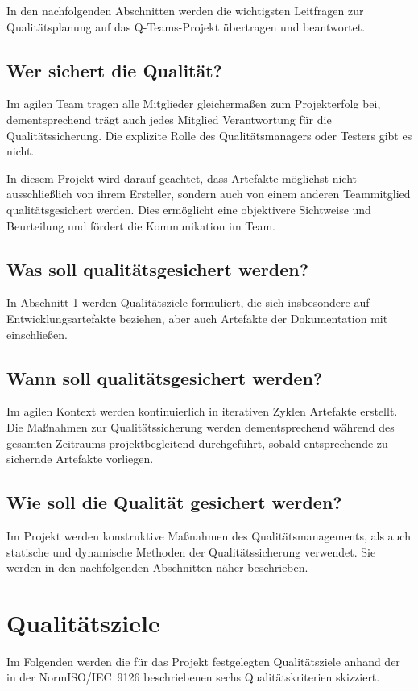 \documentclass[a4paper,11pt,listof=numbered,glossary=totoc,parskip=half,toc=bib]{scrreprt}
\begin{document}
	In den nachfolgenden Abschnitten werden die wichtigsten Leitfragen zur Qualitätsplanung auf das Q-Teams-Projekt übertragen und beantwortet.
	
	\subsection{Wer sichert die Qualität?}
	Im agilen Team tragen alle Mitglieder gleichermaßen zum Projekterfolg bei, dementsprechend trägt auch jedes Mitglied Verantwortung für die Qualitätssicherung. Die explizite Rolle des Qualitätsmanagers oder Testers gibt es nicht.
	
	In diesem Projekt wird darauf geachtet, dass Artefakte möglichst nicht ausschließlich von ihrem Ersteller, sondern auch von einem anderen Teammitglied qualitätsgesichert werden. Dies ermöglicht eine objektivere Sichtweise und Beurteilung und fördert die Kommunikation im Team.
	
	\subsection{Was soll qualitätsgesichert werden?}
	In Abschnitt \ref{sec:qziele} werden Qualitätsziele formuliert, die sich insbesondere auf Entwicklungsartefakte beziehen, aber auch Artefakte der Dokumentation mit einschließen.

	\subsection{Wann soll qualitätsgesichert werden?}
	Im agilen Kontext werden kontinuierlich in iterativen Zyklen Artefakte erstellt. Die Maßnahmen zur Qualitätssicherung werden dementsprechend während des gesamten Zeitraums projektbegleitend durchgeführt, sobald entsprechende zu sichernde Artefakte vorliegen.
	
	\subsection{Wie soll die Qualität gesichert werden?}
	Im Projekt werden konstruktive Maßnahmen des Qualitätsmanagements, als auch statische und dynamische Methoden der Qualitätssicherung verwendet. Sie werden in den nachfolgenden Abschnitten näher beschrieben.
	
	
	\section{Qualitätsziele}
	\label{sec:qziele}
	Im Folgenden werden die für das Projekt festgelegten Qualitätsziele anhand der in der Norm\linebreak ISO/IEC~9126 beschriebenen sechs Qualitätskriterien skizziert.
	
\end{document}
